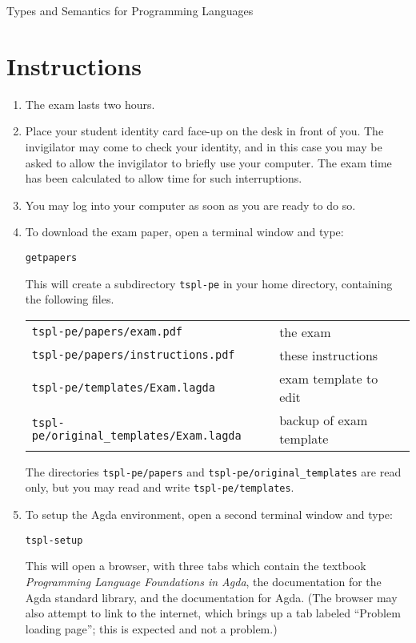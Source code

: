 \documentclass[12pt]{article}
\begin{document}
\pagestyle{empty}
\setcounter{page}{1}

\begin{center}
\large Types and Semantics for Programming Languages
\end{center}

\section*{Instructions}

\begin{enumerate}

\item
  The exam lasts two hours.

\item
  Place your student identity card face-up on the desk in front of you.  The
  invigilator may come to check your identity, and in this case you may be asked
  to allow the invigilator to briefly use your computer.  The exam time has been
  calculated to allow time for such interruptions.

\item
  You may log into your computer as soon as you are ready to do so.

\item
  To download the exam paper, open a terminal window and type:
  \begin{center}
    \texttt{getpapers}
  \end{center}
  This will create a subdirectory \texttt{tspl-pe} in your home directory,
  containing the following files.
  \begin{center}
    \begin{tabular}{ll}
      \texttt{tspl-pe/papers/exam.pdf}                & the exam \\
      \texttt{tspl-pe/papers/instructions.pdf}        & these instructions \\
      \texttt{tspl-pe/templates/Exam.lagda}           & exam template to edit \\
      \texttt{tspl-pe/original\_templates/Exam.lagda} & backup of exam template
    \end{tabular}
  \end{center}
  The directories \texttt{tspl-pe/papers} and
  \texttt{tspl-pe/original\_templates}
  are read only, but you may read and write \texttt{tspl-pe/templates}.

\item
  To setup the Agda environment, open a second terminal window and type:
  \begin{center}
    \texttt{tspl-setup}
  \end{center}
  This will open a browser, with three tabs which contain the textbook
  \emph{Programming Language Foundations in Agda}, the documentation for the
  Agda standard library, and the documentation for Agda.  (The browser may
  also attempt to link to the internet, which brings up a tab labeled
  ``Problem loading page''; this is expected and not a problem.)


\end{enumerate}
\end{document}
